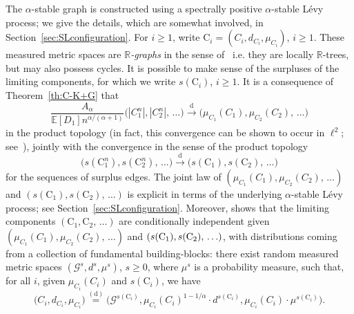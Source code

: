 \documentclass[10pt]{amsart}
\theoremstyle{definition}\newtheorem{defi}[theo]{Definition}\newtheorem{rema}[theo]{Remark}\newtheorem{exam}[theo]{Example}\newtheorem{exem}[theo]{Example}\newtheorem{nota}[theo]{Notation}
\newcommand{\convdist}{\ensuremath{\overset{\mathrm{d}}{\rightarrow}}}
\newcommand{\equidist}{\ensuremath{\stackrel{\mathrm{(d)}}{=}}}
\newcommand{\rmC}{\mathrm{C}}
\newcommand{\cG}{\mathcal{G}}
\newcommand{\R}{\mathbb{R}}
\newcommand{\bbE}{\mathbb{E}}
\begin{document}
The $\alpha$-stable graph is constructed using a spectrally positive $\alpha$-stable Lévy process; we give the details, which are somewhat involved, in Section~\ref{sec:SLconfiguration}. For $i \ge 1$, write $\rmC_i = (C_i, d_{C_i}, \mu_{C_i})$, $i \ge 1$. These measured metric spaces are \emph{$\R$-graphs} in the sense of~\cite{ABBrGoMi} i.e. they are locally $\R$-trees, but may also possess cycles. It is possible to make sense of the surpluses of the limiting components, for which we write $s(\rmC_i)$, $i \ge 1$. It is a consequence of Theorem~\ref{th:C-K+G} that
\begin{equation}\label{eqn:convsizes}
\frac{A_{\alpha}}{\bbE[D_1] n^{\alpha/(\alpha+1)}}\big(\left|C_1^n\right|, \left|C_2^n\right|,\,\ldots\big) \convdist \big(\mu_{C_1}\left(C_1\right), \mu_{C_2}\left(C_2\right),\, \ldots\big)
\end{equation}
in the product topology (in fact, this convergence can be shown to occur in $\ell^2$; see~\cite[Proposition~5.6]{CKG17+}), jointly with the convergence in the sense of the product topology
\begin{equation}\label{eqn:convsurplus}
\big(s\left(\rmC_1^n\right), s\left(\rmC_2^n\right),\, \ldots\big) \convdist \big(s\left(\rmC_1\right), s\left(\rmC_2\right),\,\ldots\big)
\end{equation}
for the sequences of surplus edges. The joint law of $(\mu_{C_1}(C_1), \mu_{C_2}(C_2),\,\ldots)$ and $(s(\rmC_1), s(\rmC_2),\,\ldots)$ is explicit in terms of the underlying $\alpha$-stable Lévy process; see Section~\ref{sec:SLconfiguration}. Moreover, \cite[Theorem~1.2]{CKG17+} shows that the limiting components $(\rmC_1,\rmC_2,\,\ldots)$ are conditionally independent given $(\mu_{C_1}(C_1), \mu_{C_2}(C_2),\,\ldots)$ and $(s(\rmC_1),\linebreak s(\rmC_2),\,\ldots)$, with distributions coming from a collection of fundamental building-blocks: there exist random measured metric spaces $(\cG^s,d^s, \mu^s)$, $s \geq 0$, where $\mu^s$ is a probability measure, such that, for all $i$, given $\mu_{C_i}(C_i)$ and $s(\rmC_i)$, we have
\[
\big(C_i, d_{C_i}, \mu_{C_i} \big)\equidist \big(\cG^{s(\rmC_i)}, \mu_{C_i}(C_i)^{1-1/\alpha} \cdot d^{s(\rmC_i)}, \mu_{C_i}(C_i) \cdot \mu^{s(\rmC_i)}\big).
\]
\end{document}
